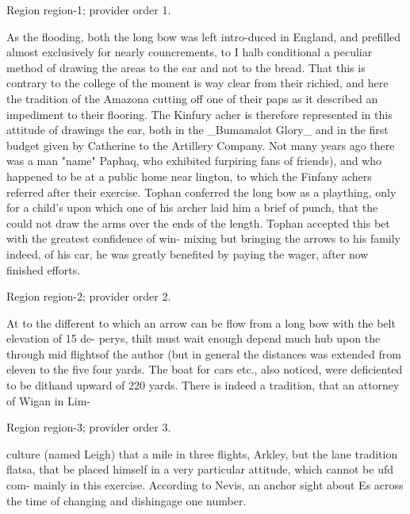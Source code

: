 \documentclass[11pt]{article}
\begin{document}
{\scriptsize\color{gray} Region region-1; provider order 1.\par}
\medskip

As the flooding, both the long bow was left intro-duced in England, and prefilled almost exclusively for nearly councrements, to I halb conditional a peculiar method of drawing the areas to the ear and not to the bread. That this is contrary to the college of the moment is way clear from their richied, and here the tradition of the Amazona cutting off one of their paps as it described an impediment to their flooring. The Kinfury acher is therefore represented in this attitude of drawings the ear, both in the \_Bumamalot Glory\_ and in the first budget given by Catherine to the Artillery Company. Not many years ago there was a man "name" Paphaq, who exhibited furpiring fans of friends), and who happened to be at a public home near lington, to which the Finfany achers referred after their exercise. Tophan conferred the long bow as a plaything, only for a child's upon which one of his archer laid him a brief of punch, that the could not draw the arms over the ends of the length. Tophan accepted this bet with the greatest confidence of win- mixing but bringing the arrows to his family indeed, of his car, he was greatly benefited by paying the wager, after now finished efforts.
\par

{\scriptsize\color{gray} Region region-2; provider order 2.\par}
\medskip

At to the different to which an arrow can be flow from a long bow with the belt elevation of 15 de- perys, thilt must wait enough depend much hub upon the through mid flightsof the author (but in general the distances was extended from eleven to the five four yards. The boat for cars etc., also noticed, were deficiented to be dithand upward of 220 yards. There is indeed a tradition, that an attorney of Wigan in Lim-
\par

{\scriptsize\color{gray} Region region-3; provider order 3.\par}
\medskip

culture (named Leigh) that a mile in three flights, Arkley, but the lane tradition flatsa, that be placed himself in a very particular attitude, which cannot be ufd com- mainly in this exercise. According to Nevis, an anchor sight about Es across the time of changing and dishingage one number.
\par
\end{document}
